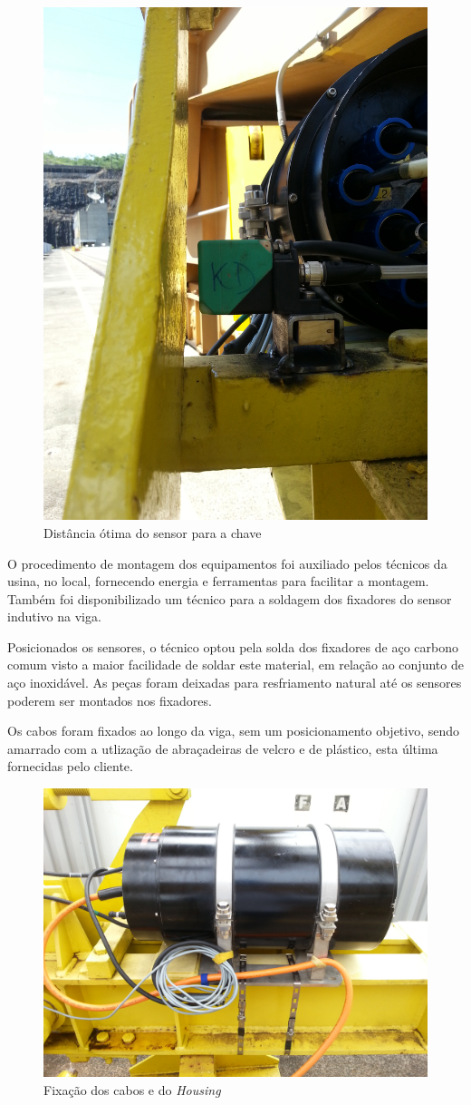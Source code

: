 \begin{figure}[h!]
\centering
	\includegraphics[width=0.7\columnwidth, angle=270]{figs/dist_sensor}
	\caption{Distância ótima do sensor para a chave}
	\label{fig::dist_sensor}
\end{figure}
 
 O procedimento de montagem dos equipamentos foi auxiliado pelos técnicos da
 usina, no local, fornecendo energia e ferramentas para facilitar a montagem.
 Também foi disponibilizado um técnico para a soldagem dos fixadores do sensor
 indutivo na viga.
 
 Posicionados os sensores, o técnico optou pela solda dos fixadores de aço
 carbono comum visto a maior facilidade de soldar este material, em relação ao
 conjunto de aço inoxidável. As peças foram deixadas para resfriamento natural
 até os sensores poderem ser montados nos fixadores.
 
 Os cabos foram fixados ao longo da viga, sem um posicionamento objetivo, sendo
 amarrado com a utlização de abraçadeiras de velcro e de plástico, esta última
 fornecidas pelo cliente. 
 
\begin{figure}[h!]
\centering
	\includegraphics[width=0.8\columnwidth]{figs/fix_cabos}
	\caption{Fixação dos cabos e do \textit{Housing}}
	\label{fig::fix_cabos}
\end{figure} 

